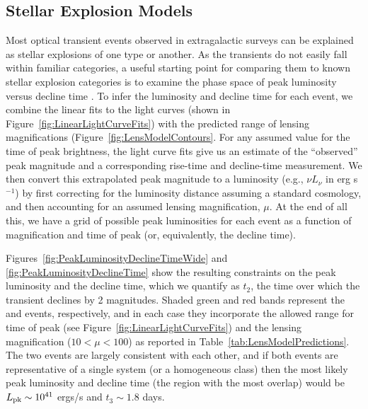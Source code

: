 \subsection{Stellar Explosion Models}
\label{sec:Classification}

Most optical transient events observed in extragalactic surveys can be
explained as stellar explosions of one type or another.  As the \spock
transients do not easily fall within familiar categories, a useful
starting point for comparing them to known stellar explosion
categories is to examine the phase space of peak luminosity versus
decline time \citep[see, e.g.,][]{Kasliwal:2010}.  To infer the
luminosity and decline time for each \spock event, we combine the
linear fits to the light curves (shown in
Figure~\ref{fig:LinearLightCurveFits}) with the predicted range of
lensing magnifications (Figure~\ref{fig:LensModelContours}. For any
assumed value for the time of peak brightness, the light curve fits
give us an estimate of the ``observed'' peak magnitude and a
corresponding rise-time and decline-time measurement.  We then convert
this extrapolated peak magnitude to a luminosity (e.g., $\nu L_\nu$ in
erg s$^{-1}$) by first correcting for the luminosity distance assuming
a standard \LCDM cosmology, and then accounting for an assumed lensing
magnification, $\mu$.  At the end of all this, we have a grid of
possible peak luminosities for each event as a function of
magnification and time of peak (or, equivalently, the decline time).

Figures~\ref{fig:PeakLuminosityDeclineTimeWide} and
\ref{fig:PeakLuminosityDeclineTime} show the resulting
constraints on the peak luminosity and the decline time, which we
quantify as $t_2$, the time over which the transient declines by 2
magnitudes.  Shaded green and red bands represent the \spockone and
\spocktwo events, respectively, and in each case they incorporate the
allowed range for time of peak (see
Figure~\ref{fig:LinearLightCurveFits}) and the lensing magnification
($10<\mu<100$) as reported in Table~\ref{tab:LensModelPredictions}.
The two events are largely consistent with each other, and if both
events are representative of a single system (or a homogeneous class)
then the most likely peak luminosity and decline time (the region with
the most overlap) would be $L_{\rm pk}\sim10^{41}$ ergs/s and
$t_3\sim1.8$ days.


